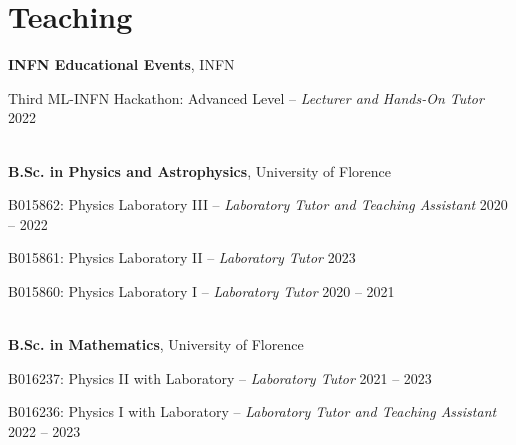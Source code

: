 \newcommand{\teaching}[2]
  {\normalsize \textbf{\color{hlcolor-0} #1}, {\color{hlcolor-1} #2}}
  
\newcommand{\teachclass}[3]
  {{\normalsize \color{maincolor} #1 --}
  {\small \color{maincolor} \emph{#2}} \hfill 
  {\normalsize \color{hlcolor-2} #3}}


\section*{Teaching}
\begin{cvcontent}
  \teaching{INFN Educational Events}{INFN}
  \\ [1mm]
  \begin{itemize*}[label=\textcolor{iconcolor}{\textbullet}]
    \item \teachclass{Third ML-INFN Hackathon: Advanced Level}
      {Lecturer and Hands-On Tutor}{2022}
  \end{itemize*}
  \\ [4mm]
  \teaching{B.Sc. in Physics and Astrophysics}{University of Florence}
  \\ [1mm]
  \begin{itemize*}[label=\textcolor{iconcolor}{\textbullet}]
    \item \teachclass{B015862: Physics Laboratory III}
      {Laboratory Tutor and Teaching Assistant}{2020 -- 2022}\\ [0.5mm]
    \item \teachclass{B015861: Physics Laboratory II}
      {Laboratory Tutor}{2023}\\ [0.5mm]
    \item \teachclass{B015860: Physics Laboratory I}
      {Laboratory Tutor}{2020 -- 2021}
  \end{itemize*}
  \\ [4mm]
  \teaching{B.Sc. in Mathematics}{University of Florence}
  \\ [1mm]
  \begin{itemize*}[label=\textcolor{iconcolor}{\textbullet}]
    \item \teachclass{B016237: Physics II with Laboratory}
      {Laboratory Tutor}{2021 -- 2023}\\ [0.5mm]
    \item \teachclass{B016236: Physics I with Laboratory}
      {Laboratory Tutor and Teaching Assistant}{2022 -- 2023}

\end{itemize*}
\end{cvcontent}
